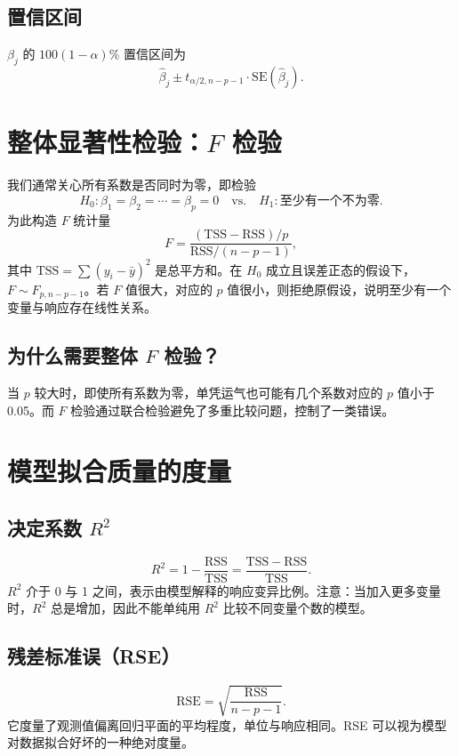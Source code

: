 \documentclass[UTF8]{ctexart}
\numberwithin{equation}{section}
\begin{document}
\subsection{置信区间}
\(\beta_j\) 的 \(100(1-\alpha)\%\) 置信区间为
\[
\hat{\beta}_j \pm t_{\alpha/2, n-p-1} \cdot \mathrm{SE}(\hat{\beta}_j).
\]

\section{整体显著性检验：\(F\) 检验}

我们通常关心所有系数是否同时为零，即检验
\[
H_0: \beta_1 = \beta_2 = \cdots = \beta_p = 0 \quad \text{vs.} \quad H_1: \text{至少有一个不为零}.
\]
为此构造 \(F\) 统计量
\begin{equation}
F = \frac{(\mathrm{TSS} - \mathrm{RSS})/p}{\mathrm{RSS}/(n-p-1)},
\label{eq:fstat}
\end{equation}
其中 \(\mathrm{TSS} = \sum (y_i - \bar{y})^2\) 是总平方和。在 \(H_0\) 成立且误差正态的假设下，\(F \sim F_{p, n-p-1}\)。若 \(F\) 值很大，对应的 \(p\) 值很小，则拒绝原假设，说明至少有一个变量与响应存在线性关系。

\subsection{为什么需要整体 \(F\) 检验？}
当 \(p\) 较大时，即使所有系数为零，单凭运气也可能有几个系数对应的 \(p\) 值小于 0.05。而 \(F\) 检验通过联合检验避免了多重比较问题，控制了一类错误。

\section{模型拟合质量的度量}

\subsection{决定系数 \(R^2\)}
\begin{equation}
R^2 = 1 - \frac{\mathrm{RSS}}{\mathrm{TSS}} = \frac{\mathrm{TSS} - \mathrm{RSS}}{\mathrm{TSS}}.
\label{eq:r2}
\end{equation}
\(R^2\) 介于 0 与 1 之间，表示由模型解释的响应变异比例。注意：当加入更多变量时，\(R^2\) 总是增加，因此不能单纯用 \(R^2\) 比较不同变量个数的模型。

\subsection{残差标准误（RSE）}
\begin{equation}
\mathrm{RSE} = \sqrt{\frac{\mathrm{RSS}}{n-p-1}}.
\label{eq:rse}
\end{equation}
它度量了观测值偏离回归平面的平均程度，单位与响应相同。RSE 可以视为模型对数据拟合好坏的一种绝对度量。
\end{document}
